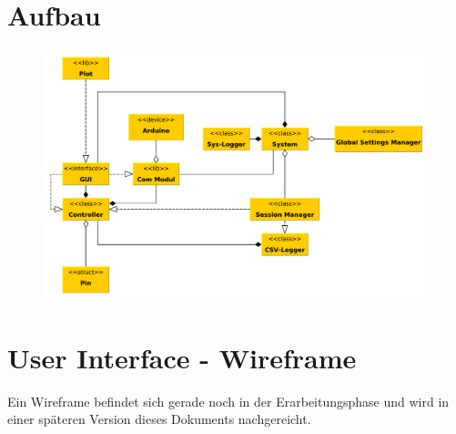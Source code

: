 \section{Aufbau}
\begin{figure}[H]
 \centering
 \includegraphics[width=\textwidth, keepaspectratio=true]{../Diagramme/StrukturUML.pdf}
\end{figure}
\section{User Interface - Wireframe}
Ein Wireframe befindet sich gerade noch in der Erarbeitungsphase und wird in einer späteren Version dieses Dokuments nachgereicht.